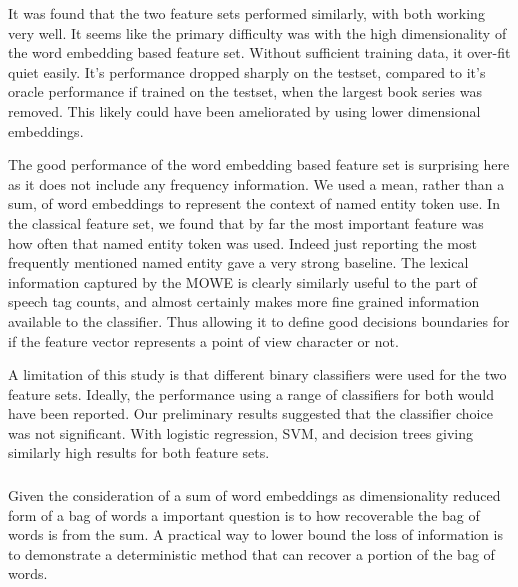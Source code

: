 \documentclass{book}
\begin{document}
It was found that the two feature sets performed similarly, with both working very well.
It seems like the primary difficulty was with the high dimensionality of the word embedding based feature set.
Without sufficient training data, it over-fit quiet easily.
It's performance dropped sharply on the testset, compared to it's oracle performance if trained on the testset,
when the largest book series was removed.
This likely could have been ameliorated by using lower dimensional embeddings.

The good performance of the word embedding based feature set is surprising here as it does not include any frequency information.
We used a mean, rather than a sum, of word embeddings to represent the context of named entity token use.
In the classical feature set, we found that by far the most important feature was how often that named entity token was used.
Indeed just reporting the most frequently mentioned named entity gave a very strong baseline.
The lexical information captured by the MOWE is clearly similarly useful to the part of speech tag counts, and almost certainly makes more fine grained information available to the classifier.
Thus allowing it to define good decisions boundaries for if the feature vector represents a point of view character or not.


A limitation of this study is that different binary classifiers were used for the two feature sets.
Ideally, the performance using a range of classifiers for both would have been reported.
Our preliminary results suggested that the classifier choice was not significant.
With logistic regression, SVM, and decision trees giving similarly high results for both feature sets.
 







\subsubsection{ }
Given the consideration of a sum of word embeddings as dimensionality reduced form of a bag of words
a important question is to how recoverable the bag of words is from the sum.
A practical way to lower bound the loss of information
is to demonstrate a deterministic method that can recover a portion of the bag of words.
\end{document}
